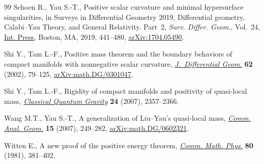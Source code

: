 \documentclass[pdftex]{sigma}
\numberwithin{equation}{section}
\begin{document}
\begin{thebibliography}{99}
Schoen R., Yau S.-T., Positive scalar curvature and minimal hypersurface
 singularities, in Surveys in Differential Geometry 2019, {D}ifferential
 geometry, {C}alabi--{Y}au Theory, and General Relativity. {P}art~2,
 \textit{Surv. Differ. Geom.}, Vol.~24, \href{https://dx.doi.org/10.4310/SDG.2019.v24.n1.a10}{Int. Press}, Boston, MA, 2019,
 441--480, \href{https://arxiv.org/abs/1704.05490}{arXiv:1704.05490}.

Shi Y., Tam L.-F., Positive mass theorem and the boundary behaviors of compact
 manifolds with nonnegative scalar curvature, \href{https://doi.org/10.4310/jdg/1090425530}{\textit{J.~Differential Geom.}}
 \textbf{62} (2002), 79--125, \href{https://arxiv.org/abs/math.DG/0301047}{arXiv:math.DG/0301047}.

Shi Y., Tam L.-F., Rigidity of compact manifolds and positivity of quasi-local
 mass, \href{https://doi.org/10.1088/0264-9381/24/9/013}{\textit{Classical Quantum Gravity}} \textbf{24} (2007), 2357--2366.

Wang M.T., Yau S.-T., A generalization of {L}iu--{Y}au's quasi-local mass,
 \href{https://dx.doi.org/10.4310/CAG.2007.v15.n2.a2}{\textit{Comm. Anal. Geom.}} \textbf{15} (2007), 249--282,
 \href{https://arxiv.org/abs/math.DG/0602321}{arXiv:math.DG/0602321}.

Witten E., A new proof of the positive energy theorem, \href{https://doi.org/10.1007/BF01208277}{\textit{Comm. Math.
 Phys.}} \textbf{80} (1981), 381--402.

\end{thebibliography}\LastPageEnding
\end{document}
